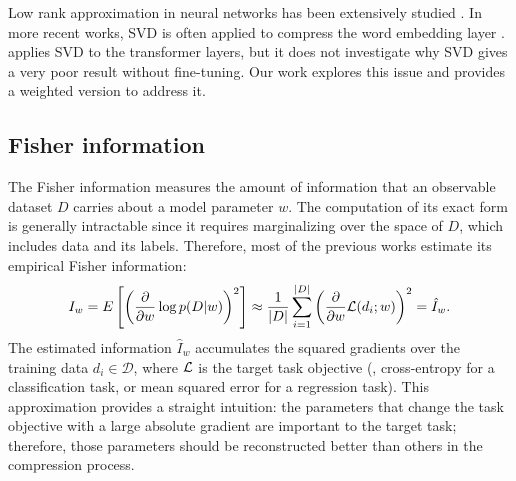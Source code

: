 Low rank approximation in neural networks has been extensively studied \citep{jaderberg2014speeding,zhang2015accelerating,denton2014exploiting}. In more recent works, SVD is often applied to compress the word embedding layer \citep{chen2018groupreduce, acharya2019online}. \cite{noach2020compressing} applies SVD to the transformer layers, but it does not investigate why SVD gives a very poor result without fine-tuning. Our work explores this issue and provides a weighted version to address it. 



\subsection{Fisher information}
The Fisher information measures the amount of information that an observable dataset $D$ carries about a model parameter $w$. The computation of its exact form is generally intractable since it requires marginalizing over the space of $D$, which includes data and its labels. 
Therefore, most of the previous works estimate its empirical Fisher information:
\begin{equation}
    I_w =E\left[\left(\frac{\partial}{{\partial w }} \log p(D|w )\right)^2\right] \approx \frac{1}{|D|}\sum\limits_{i = 1}^{|D|} {\left( {\frac{\partial }{{\partial w }}{\mathcal{L}}(d_i;w)} \right)^2}={\hat I_w}.
    \label{equ:empirical_fisher}
\end{equation}
The estimated information $\hat I_w$ accumulates the squared gradients over the training data $d_i \in \mathcal{D}$, where ${\mathcal{L}}$ is the target task objective (\eg, cross-entropy for a classification task, or mean squared error for a regression task). This approximation provides a straight intuition: the parameters that change the task objective with a large absolute gradient are important to the target task; therefore, those parameters should be reconstructed better than others in the compression process.

